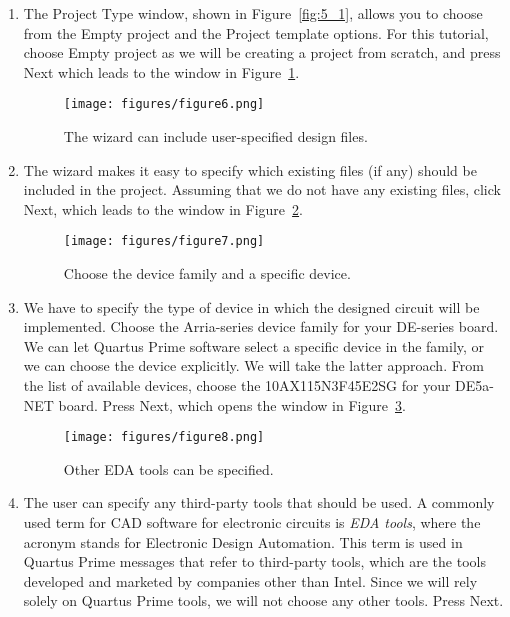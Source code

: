 \begin{enumerate}
\item The {\sf Project Type} window, shown in Figure~\ref{fig:5_1}, allows you to choose from
the {\sf Empty project} and the {\sf Project template} options. For this tutorial, choose {\sf Empty project} 
as we will be creating a project from scratch, and press {\sf Next} which leads to the window in Figure~\ref{fig:6}. 

\begin{figure}[H]
   \begin{center}
      \texttt{[image: figures/figure6.png]}
   \caption{The wizard can include user-specified design files.} 
	 \label{fig:6}
	 \end{center}
\end{figure}

\item The wizard makes it easy to 
specify which existing files (if any) should be included in the project.
Assuming that we do not have any existing files, click {\sf Next}, which leads
to the window in Figure~\ref{fig:7}.

\begin{figure}[H]
   \begin{center}
      \texttt{[image: figures/figure7.png]}
   \caption{Choose the device family and a specific device.} 
	 \label{fig:7}
	 \end{center}
\end{figure}

\item We have to specify the type of device in which the designed circuit will 
be implemented.
Choose the Arria-series device family for your DE-series board. 
We can let Quartus Prime software select a specific device in the family, 
or we can choose the device explicitly. 
We will take the latter approach. 
From the list of available devices, choose the 10AX115N3F45E2SG for your DE5a-NET board. 
Press {\sf Next}, which opens the window in Figure~\ref{fig:8}.

\begin{figure}[H]
   \begin{center}
      \texttt{[image: figures/figure8.png]}
   \caption{Other EDA tools can be specified.} 
	 \label{fig:8}
	 \end{center}
\end{figure}

\item The user can specify any third-party tools that should be used.
A commonly used term for CAD software for electronic circuits
is {\it EDA tools}, where the acronym stands for Electronic Design Automation.
This term is used in Quartus Prime messages that refer to third-party tools, 
which are the tools developed and marketed by companies other than Intel.
Since we will rely solely on Quartus Prime tools, we will not choose 
any other tools.  Press {\sf Next}.
 

\end{enumerate}
